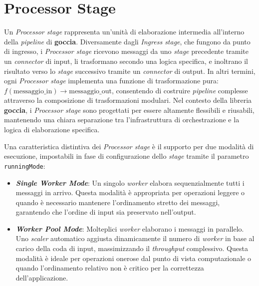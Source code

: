 \section[Processor Stage]{Processor Stage}

Un \textit{Processor stage} rappresenta un'unità di elaborazione intermedia all'interno della \textit{pipeline} di \textbf{goccia}. Diversamente dagli \textit{Ingress stage}, che fungono da punto di ingresso, i \textit{Processor stage} ricevono messaggi da uno \textit{stage} precedente tramite un \textit{connector} di input, li trasformano secondo una logica specifica, e inoltrano il risultato verso lo \textit{stage} successivo tramite un \textit{connector} di output. In altri termini, ogni \textit{Processor stage} implementa una funzione di trasformazione pura: $f(\text{messaggio\_in}) \to \text{messaggio\_out}$, consentendo di costruire \textit{pipeline} complesse attraverso la composizione di trasformazioni modulari. Nel contesto della libreria \textbf{goccia}, i \textit{Processor stage} sono progettati per essere altamente flessibili e riusabili, mantenendo una chiara separazione tra l'infrastruttura di orchestrazione e la logica di elaborazione specifica.

Una caratteristica distintiva dei \textit{Processor stage} è il supporto per due modalità di esecuzione, impostabili in fase di configurazione dello \textit{stage} tramite il parametro \texttt{runningMode}:

\begin{itemize}
    \item \textbf{\textit{Single Worker Mode}}: Un singolo \textit{worker} elabora sequenzialmente tutti i messaggi in arrivo. Questa modalità è appropriata per operazioni leggere o quando è necessario mantenere l'ordinamento stretto dei messaggi, garantendo che l'ordine di input sia preservato nell'output.

    \item \textbf{\textit{Worker Pool Mode}}: Molteplici \textit{worker} elaborano i messaggi in parallelo. Uno \textit{scaler} automatico aggiusta dinamicamente il numero di \textit{worker} in base al carico della coda di input, massimizzando il \textit{throughput} complessivo. Questa modalità è ideale per operazioni onerose dal punto di vista computazionale o quando l'ordinamento relativo non è critico per la correttezza dell'applicazione.
\end{itemize}








